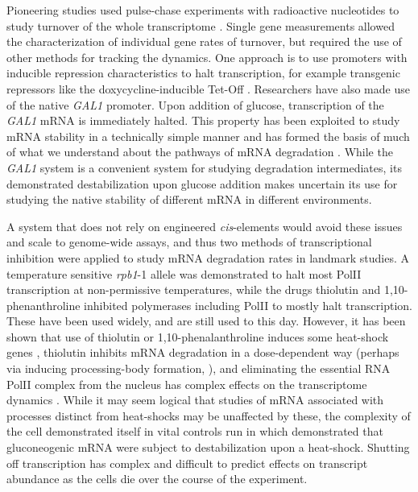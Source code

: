 Pioneering studies used pulse-chase experiments with radioactive
nucleotides to study turnover of the whole transcriptome 
\parencite{petersen1976half}.
Single gene measurements allowed the characterization of individual
gene rates of turnover, but required the use of other methods for
tracking the dynamics.
One approach is to use promoters with inducible repression
characteristics to halt transcription, for example transgenic
repressors like the doxycycline-inducible Tet-Off 
\parencite{gari1997set}.
Researchers have also made use of the native \textit{GAL1} promoter. 
Upon addition of glucose, transcription of the \textit{GAL1} mRNA is 
immediately halted. This property has been exploited to study mRNA 
stability in a technically simple manner and has formed the basis of 
much of what we understand about the pathways of mRNA degradation
\parencite{parker2012rna,coller2004eukaryotic}.
While the \textit{GAL1} system is a convenient system for studying 
degradation intermediates, its demonstrated destabilization upon
glucose addition makes uncertain its use for studying the native stability 
of different mRNA in different environments.  

A system
that does not rely on engineered \textit{cis}-elements would avoid 
these issues and scale to genome-wide assays, and thus two methods of
transcriptional inhibition were applied to study mRNA degradation
rates in landmark studies. A temperature sensitive \textit{rpb1}-1 
allele was demonstrated to halt most PolII transcription at 
non-permissive temperatures, while the drugs thiolutin and 
1,10-phenanthroline
inhibited polymerases including PolII to mostly halt transcription.
These have been used widely, and are still used to this day. However,
it has been shown that use of thiolutin or 1,10-phenalanthroline
induces some heat-shock genes \parencite{adams1991yeast}, thiolutin
inhibits mRNA degradation in a dose-dependent way 
\parencite{pelechano2008transcriptional}
(perhaps via inducing processing-body formation,
\cite{huch2016decapping}), 
and eliminating the essential RNA PolII complex
from the nucleus has complex effects on the transcriptome dynamics 
\parencite{yu2016rna}. While it may seem logical that studies of mRNA
associated with processes distinct from heat-shocks may be unaffected
by these, the complexity of the cell demonstrated itself in vital
controls run in \cite{mercado1994levels} which demonstrated that
gluconeogenic mRNA were subject to destabilization upon a
heat-shock. Shutting off transcription has complex and difficult to
predict effects on transcript abundance as the cells die over the
course of the experiment.  

